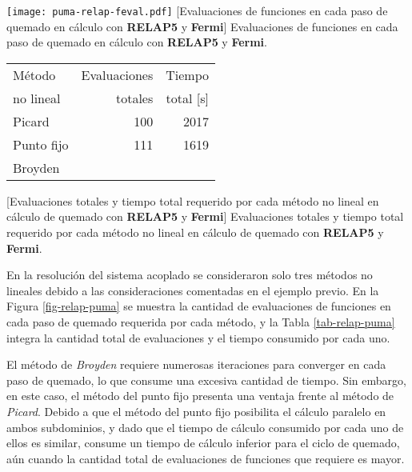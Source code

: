 \begin{minipage}{\textwidth}
\begin{minipage}[b]{0.49\textwidth}
  \centering
  \texttt{[image: puma-relap-feval.pdf]}
  \label{fig-relap-puma}
  \captionsetup{width=0.8\textwidth}
  [Evaluaciones de funciones en cada paso de quemado en cálculo con \textbf{RELAP5} y \textbf{Fermi}]
  {Evaluaciones de funciones en cada paso de quemado en cálculo con \textbf{RELAP5} y \textbf{Fermi}.}
\end{minipage}
\hfill
\begin{minipage}[b]{0.49\textwidth}
  \centering
  \begin{tabular}{ l r r } \hline
      Método & Evaluaciones & Tiempo \\
      no lineal & totales & total [s] \\ \hline %
      Picard & 100 & 2017 \\ %
      Punto fijo & 111 & 1619  \\ %
      Broyden &  &  \\ \hline
   \end{tabular}
   \label{tab-relap-puma}
   \captionsetup{width=0.8\textwidth}
   [Evaluaciones totales y tiempo total requerido por cada método no lineal en cálculo de quemado con \textbf{RELAP5} y \textbf{Fermi}]
   {Evaluaciones totales y tiempo total requerido por cada método no lineal en cálculo de quemado con \textbf{RELAP5} y \textbf{Fermi}.}
  \end{minipage}
\end{minipage}

En la resolución del sistema acoplado se consideraron solo tres métodos no lineales debido a las consideraciones comentadas en el ejemplo previo.
En la Figura \ref{fig-relap-puma} se muestra la cantidad de evaluaciones de funciones en cada paso de quemado requerida por cada método,
y la Tabla \ref{tab-relap-puma} integra la cantidad total de evaluaciones y el tiempo consumido por cada uno.

El método de \textit{Broyden} requiere numerosas iteraciones para converger en cada paso de quemado, lo que consume una excesiva cantidad de tiempo.
Sin embargo, en este caso, el método del punto fijo presenta una ventaja frente al método de \textit{Picard}.
Debido a que el método del punto fijo posibilita el cálculo paralelo en ambos subdominios, y dado que el tiempo de cálculo consumido por cada uno de ellos es similar,
consume un tiempo de cálculo inferior para el ciclo de quemado, aún cuando la cantidad total de evaluaciones de funciones que requiere es mayor.
